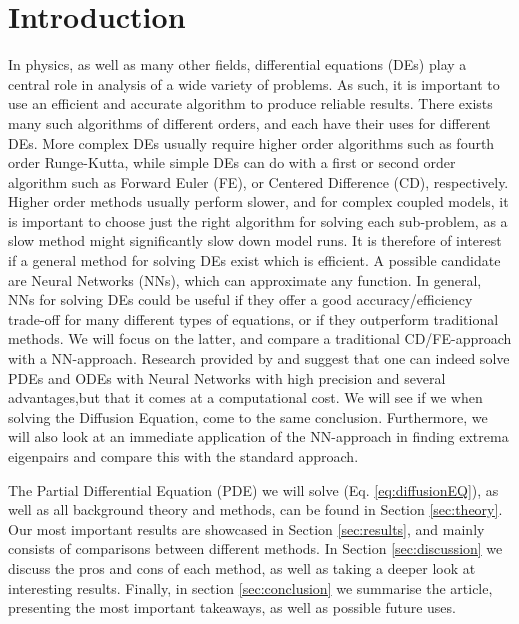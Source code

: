 \section{Introduction}
\label{sec:introduction}
In physics, as well as many other fields, differential equations (DEs) play a central role in analysis of a wide variety of problems. As such, it is important to use an efficient and accurate algorithm to produce reliable results. There exists many such algorithms of different orders, and each have their uses for different DEs. More complex DEs usually require higher order algorithms such as fourth order Runge-Kutta, while simple DEs can do with a first or second order algorithm such as Forward Euler (FE), or Centered Difference (CD), respectively. Higher order methods usually perform slower, and for complex coupled models, it is important to choose just the right algorithm for solving each sub-problem, as a slow method might significantly slow down model runs. It is therefore of interest if a general method for solving DEs exist which is efficient. A possible candidate are Neural Networks (NNs), which can approximate any function. In general, NNs for solving DEs could be useful if they offer a good accuracy/efficiency trade-off for many different types of equations, or if they outperform traditional methods. We will focus on the latter, and compare a traditional CD/FE-approach with a NN-approach. Research provided by \cite{lagaris1998artificial} and \cite{chiaramonte2013solving} suggest that one can indeed solve PDEs and ODEs with Neural Networks with high precision and several advantages,but that it comes at a computational cost. We will see if we when solving the Diffusion Equation, come to the same conclusion. Furthermore, we will also look at an immediate application of the NN-approach in finding extrema eigenpairs \citep{yi2004neural} and compare this with the standard approach.

The Partial Differential Equation (PDE) we will solve (Eq. \ref{eq:diffusionEQ}), as well as all background theory and methods, can be found in Section \ref{sec:theory}. Our most important results are showcased in Section \ref{sec:results}, and mainly consists of comparisons between different methods. In Section \ref{sec:discussion} we discuss the pros and cons of each method, as well as taking a deeper look at interesting results. Finally, in section \ref{sec:conclusion} we summarise the article, presenting the most important takeaways, as well as possible future uses.
